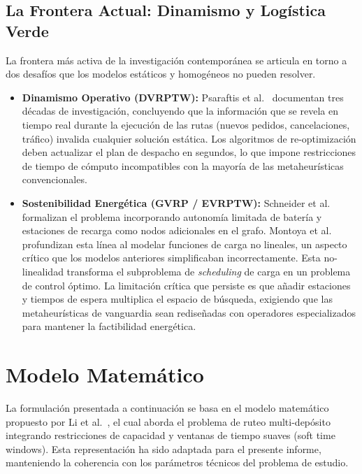 \documentclass[letter, 10pt]{article}
\begin{document}
\subsection{La Frontera Actual: Dinamismo y Log\'istica Verde}

La frontera m\'as activa de la investigaci\'on contempor\'anea se articula en torno a dos desaf\'ios que los modelos est\'aticos y homog\'eneos no pueden resolver.

\begin{itemize}
\item \textbf{Dinamismo Operativo (DVRPTW):} Psaraftis et al.~\cite{psaraftis2016dynamic} documentan tres d\'ecadas de investigaci\'on, concluyendo que la informaci\'on que se revela en tiempo real durante la ejecuci\'on de las rutas (nuevos pedidos, cancelaciones, tr\'afico) invalida cualquier soluci\'on est\'atica. Los algoritmos de re-optimizaci\'on deben actualizar el plan de despacho en segundos, lo que impone restricciones de tiempo de c\'omputo incompatibles con la mayor\'ia de las metaheur\'isticas convencionales.
\item \textbf{Sostenibilidad Energ\'etica (GVRP / EVRPTW):} Schneider et al.~\cite{schneider2014electric} formalizan el problema incorporando autonom\'ia limitada de bater\'ia y estaciones de recarga como nodos adicionales en el grafo. Montoya et al.~\cite{montoya2017electric} profundizan esta l\'inea al modelar funciones de carga no lineales, un aspecto cr\'itico que los modelos anteriores simplificaban incorrectamente. Esta no-linealidad transforma el subproblema de \textit{scheduling} de carga en un problema de control \'optimo. La limitaci\'on cr\'itica que persiste es que a\~nadir estaciones y tiempos de espera multiplica el espacio de b\'usqueda, exigiendo que las metaheur\'isticas de vanguardia sean redise\~nadas con operadores especializados para mantener la factibilidad energ\'etica.
\end{itemize}

\section{Modelo Matem\'atico}

La formulaci\'on presentada a continuaci\'on se basa en el modelo matem\'atico propuesto por Li et al.~\cite{10603115}, el cual aborda el problema de ruteo multi-dep\'osito integrando restricciones de capacidad y ventanas de tiempo suaves (soft time windows). Esta representaci\'on ha sido adaptada para el presente informe, manteniendo la coherencia con los par\'ametros t\'ecnicos del problema de estudio.
\end{document}
